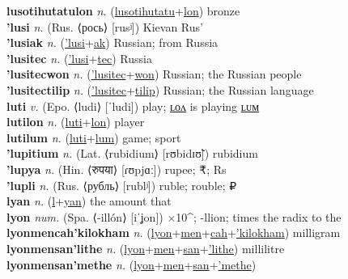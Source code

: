 \textbf{lusotihutatulon} \textit{n.} (\hyperref[lusotihutatu]{lusotihutatu}+\hyperref[lon]{lon})
bronze \label{lusotihutatulon} \\
\textbf{'lusi} \textit{n.} (Rus. ⟨рось⟩ [rusʲ])
Kievan Rus’ \label{'lusi} \\
\textbf{'lusiak} \textit{n.} (\hyperref['lusi]{'lusi}+\hyperref[ak]{ak})
Russian; from Russia \label{'lusiak} \\
\textbf{'lusitec} \textit{n.} (\hyperref['lusi]{'lusi}+\hyperref[tec]{tec})
Russia \label{'lusitec} \\
\textbf{'lusitecwon} \textit{n.} (\hyperref['lusitec]{'lusitec}+\hyperref[won]{won})
Russian; the Russian people \label{'lusitecwon} \\
\textbf{'lusitectilip} \textit{n.} (\hyperref['lusitec]{'lusitec}+\hyperref[tilip]{tilip})
Russian; the Russian language \label{'lusitectilip} \\
\textbf{luti} \textit{v.} (Epo. ⟨ludi⟩ [ˈludi])
play; \hyperref[lutilon]{ʟᴏᴧ} is playing \hyperref[lutilum]{ʟᴜᴍ} \label{luti} \\
\textbf{lutilon} \textit{n.} (\hyperref[luti]{luti}+\hyperref[lon]{lon})
player \label{lutilon} \\
\textbf{lutilum} \textit{n.} (\hyperref[luti]{luti}+\hyperref[lum]{lum})
game; sport \label{lutilum} \\
\textbf{'lupitium} \textit{n.} (Lat. ⟨rubidium⟩ [rʊbidɪʊ̃])
rubidium \label{'lupitium} \\
\textbf{'lupya} \textit{n.} (Hin. ⟨रुपया⟩ [ɾʊpjɑː])
rupee; ₹; Rs \label{'lupya} \\
\textbf{'lupli} \textit{n.} (Rus. ⟨рубль⟩ [rublʲ])
ruble; rouble; ₽ \label{'lupli} \\
\textbf{lyan} \textit{n.} (\hyperref[l]{l}+\hyperref[an]{yan})
the amount that \label{lyan} \\
\textbf{lyon} \textit{num.} (Spa. ⟨-illón⟩ [iˈʝon])
×10\textasciicircum{}; -llion; times the radix to the \label{lyon} \\
\textbf{lyonmencah'kilokham} \textit{n.} (\hyperref[lyon]{lyon}+\hyperref[men]{men}+\hyperref[cah]{cah}+\hyperref['kilokham]{'kilokham})
milligram \label{lyonmencah'kilokham} \\
\textbf{lyonmensan'lithe} \textit{n.} (\hyperref[lyon]{lyon}+\hyperref[men]{men}+\hyperref[san]{san}+\hyperref['lithe]{'lithe})
millilitre \label{lyonmensan'lithe} \\
\textbf{lyonmensan'methe} \textit{n.} (\hyperref[lyon]{lyon}+\hyperref[men]{men}+\hyperref[san]{san}+\hyperref['methe]{'methe})
